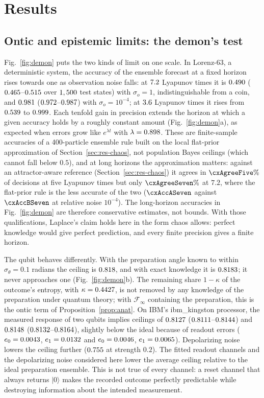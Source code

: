 \documentclass[journal]{IEEEtran}
\theoremstyle{definition}
\newcommand{\F}{\mathcal{F}}
\begin{document}
\section{Results}\label{sec:results}

\subsection{Ontic and epistemic limits: the demon's test}\label{sec:res-demon}
Fig.~\ref{fig:demon} puts the two kinds of limit on one scale. In Lorenz-63, a deterministic system, the accuracy of the ensemble forecast at a fixed horizon rises towards one as observation noise falls: at $7.2$ Lyapunov times it is $0.490$ ($0.465$--$0.515$ over $1,500$ test states) with $\sigma_o=1$, indistinguishable from a coin, and $0.981$ ($0.972$--$0.987$) with $\sigma_o=10^{-4}$; at $3.6$ Lyapunov times it rises from $0.539$ to $0.999$. Each tenfold gain in precision extends the horizon at which a given accuracy holds by a roughly constant amount (Fig.~\ref{fig:demon}a), as expected when errors grow like $e^{\lambda t}$ with $\lambda=0.898$. These are finite-sample accuracies of a 400-particle ensemble rule built on the local flat-prior approximation of Section~\ref{sec:res-chaos}, not population Bayes ceilings (which cannot fall below $0.5$), and at long horizons the approximation matters: against an attractor-aware reference (Section~\ref{sec:res-chaos}) it agrees in $\cxAgreeFive\%$ of decisions at five Lyapunov times but only $\cxAgreeSeven\%$ at $7.2$, where the flat-prior rule is the less accurate of the two ($\cxAccASeven$ against $\cxAccBSeven$ at relative noise $10^{-4}$). The long-horizon accuracies in Fig.~\ref{fig:demon} are therefore conservative estimates, not bounds. With those qualifications, Laplace's claim holds here in the form chaos allows: perfect knowledge would give perfect prediction, and every finite precision gives a finite horizon.

The qubit behaves differently. With the preparation angle known to within $\sigma_\theta=0.1$ radians the ceiling is $0.818$, and with exact knowledge it is $0.8183$; it never approaches one (Fig.~\ref{fig:demon}b). The remaining share $1-\kappa$ of the outcome's entropy, with $\kappa=0.4427$, is not removed by any knowledge of the preparation under quantum theory; with $\F_\infty$ containing the preparation, this is the ontic term of Proposition~\ref{prop:anat}. On IBM's ibm\_kingston processor, the measured response of two qubits implies ceilings of $0.8127$ ($0.8111$--$0.8144$) and $0.8148$ ($0.8132$--$0.8164$), slightly below the ideal because of readout errors ($e_0=0.0043$, $e_1=0.0132$ and $e_0=0.0046$, $e_1=0.0065$). Depolarizing noise lowers the ceiling further ($0.755$ at strength $0.2$). The fitted readout channels and the depolarizing noise considered here lower the average ceiling relative to the ideal preparation ensemble. This is not true of every channel: a reset channel that always returns $\lvert0\rangle$ makes the recorded outcome perfectly predictable while destroying information about the intended measurement.
\end{document}
